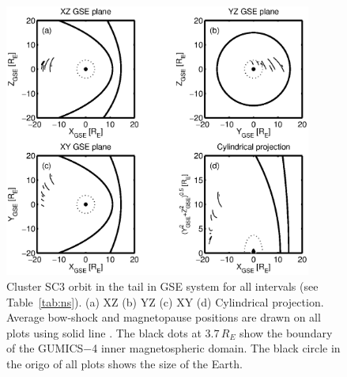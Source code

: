 \documentclass[linenumbers,draft]{agujournal}
\begin{document}
\begin{figure}[h]
\centering
\includegraphics[width=0.9\textwidth,angle=0]{swe-2020-corr-f12.eps}  
\caption{Cluster SC3 orbit in the tail in GSE system for all intervals (see Table~\ref{tab:ns}). (a) XZ (b) YZ (c) XY (d) Cylindrical projection. Average bow-shock and magnetopause positions are drawn on all plots using solid line \citep[][respectively]{peredo95:_three_alfven_mach,tsyganenko95:_model_earth}. The black dots at $3.7\,R_E$ show the boundary of the GUMICS$-$4 inner magnetospheric domain. The black circle in the origo of all plots shows the size of the Earth.}
\label{fig:nsorbit}
\end{figure}

\pagebreak
\end{document}
